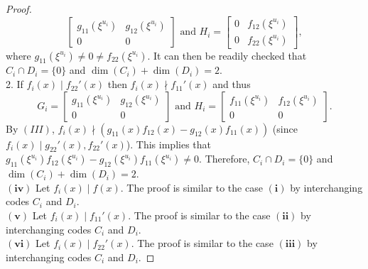 \documentclass[10pt,a4paper]{amsart}
\begin{document}
\begin{proof}
$$\begin{bmatrix}
g_{11}(\xi^{u_i}) & g_{12}(\xi^{u_i}) \\
0 &  0
\end{bmatrix} 
 \text{ and }
H_i=   \begin{bmatrix}
0 & f_{12}(\xi^{u_i}) \\
0 &   f_{22}(\xi^{u_i})
\end{bmatrix},
$$ where $g_{11}(\xi^{u_i})\neq 0\neq f_{22}(\xi^{u_i})$.
It can then be readily checked that $C_i \cap D_i= \{0\}$ and $\dim(C_i)+\dim(D_i)=2$.\\
2. If $f_i(x)\mid f_{22}'(x)$ then $f_i(x)\nmid f_{11}'(x)$ and thus
$$
G_i=   \begin{bmatrix}
g_{11}(\xi^{u_i}) & g_{12}(\xi^{u_i}) \\
0 &  0
\end{bmatrix} \text{ and }
H_i=   \begin{bmatrix}
 f_{11}(\xi^{u_i})& f_{12}(\xi^{u_i}) \\
0 &   0
\end{bmatrix}.
$$
By $(III)$, $f_i(x)\nmid (g_{11}(x)f_{12}(x)-g_{12}(x)f_{11}(x)) $ (since $f_i(x)\mid g_{22}'(x),f_{22}'(x)$). This implies that $g_{11}(\xi^{u_i})f_{12}(\xi^{u_i})-g_{12}(\xi^{u_i})f_{11}(\xi^{u_i})\neq0$. Therefore,  $C_i \cap D_i= \{0\}$ and $\dim(C_i)+\dim(D_i)=2$.\\
$\bm{(iv)}$ Let $f_i(x)\mid f(x)$. The proof is similar to the case $\bm{(i)}$ by interchanging 
codes $C_i$ and $D_i$.\\
$\bm{(v)}$ Let $f_i(x)\mid f_{11}'(x)$. The proof is similar to the case $\bm{(ii)}$ by interchanging 
codes $C_i$ and $D_i$.\\
$\bm{(vi)}$ Let $f_i(x)\mid f_{22}'(x)$. The proof is similar to the case $\bm{(iii)}$ by interchanging 
codes $C_i$ and $D_i$.
\end{proof}
\end{document}
